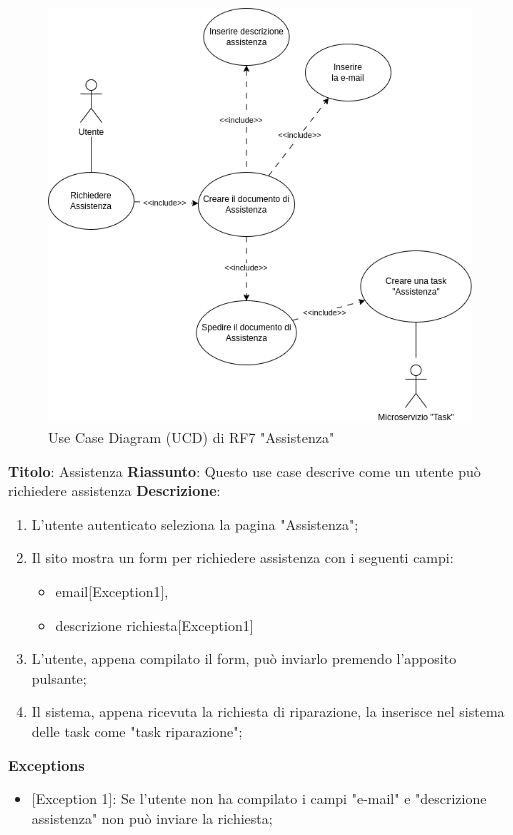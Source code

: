 \documentclass{report}
\begin{document}
\begin{figure}[H]
	\centering\includegraphics[width=1\textwidth]{images/UCD/RF7_assistenza_UCD.png}
	Use Case Diagram (UCD) di RF7 "Assistenza"
\end{figure}
\textbf{Titolo}: Assistenza \newline
\textbf{Riassunto}: Questo use case descrive come un utente può richiedere assistenza  \newline
\textbf{Descrizione}:
	\begin{enumerate}
		\item L'utente autenticato seleziona la pagina "Assistenza";
		\item Il sito mostra un form per richiedere assistenza con i seguenti campi:
		\begin{itemize}
			\item email[Exception1],
			\item descrizione richiesta[Exception1]
		\end{itemize}
		\item L'utente, appena compilato il form, può inviarlo premendo l'apposito pulsante;
		\item Il sistema, appena ricevuta la richiesta di riparazione, la inserisce nel sistema delle task come "task riparazione";
		
	\end{enumerate}
\textbf{Exceptions}
\begin{itemize}
	\item {[Exception 1]}: Se l'utente non ha compilato i campi "e-mail" e "descrizione assistenza" non può inviare la richiesta;
\end{itemize}
\end{document}
